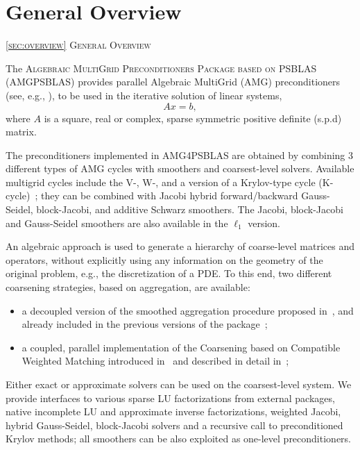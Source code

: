 \section{General Overview\label{sec:overview}}
         {\textsc{\ref{sec:overview} General Overview}}

The \textsc{Algebraic MultiGrid Preconditioners Package based on
PSBLAS} (\textsc{AMG\-PSBLAS}) provides parallel Algebraic MultiGrid (AMG) preconditioners (see, e.g., \cite{Briggs2000,Stuben_01}),
to be used in the iterative solution of  linear systems,
\begin{equation}
Ax=b,
\label{system1}
\end{equation}
where $A$ is a square, real or complex, sparse symmetric positive definite (s.p.d) matrix.
%
%

The preconditioners implemented in AMG4PSBLAS are obtained by combining
3 different types of AMG cycles with smoothers and coarsest-level
solvers. Available multigrid cycles include the V-, W-, and a version of a Krylov-type cycle
(K-cycle)~\cite{Briggs2000,Notay2008}; they can  be
combined with Jacobi hybrid 
forward/backward Gauss-Seidel, block-Jacobi, and additive Schwarz
smoothers. The  Jacobi, block-Jacobi and
Gauss-Seidel smoothers are also available in the $\ell_1$  version.

An algebraic approach is used to generate a hierarchy of
coarse-level matrices and operators, without explicitly using any information on the
geometry of the original problem, e.g., the discretization of a PDE. To this end,
two different coarsening strategies, based on aggregation, are available:
\begin{itemize}
\item a decoupled version of the  smoothed aggregation procedure
  proposed in~\cite{BREZINA_VANEK,VANEK_MANDEL_BREZINA}, and already
  included in the previous versions of the
  package~\cite{BDDF2007,MLD2P4_TOMS}; 
\item a coupled,  parallel implementation of the  Coarsening based on
  Compatible Weighted Matching introduced   in~\cite{DV2013,DFV2018}
  and described in detail in~\cite{DDF2020};  
\end{itemize}
Either exact or approximate solvers can be used on the coarsest-level
system. We provide interfaces to various  sparse LU factorizations from external 
packages, native incomplete LU and approximate inverse factorizations,
weighted Jacobi, hybrid Gauss-Seidel, block-Jacobi solvers and
a recursive call to preconditioned Krylov methods;  all 
smoothers can be also exploited as one-level preconditioners.

